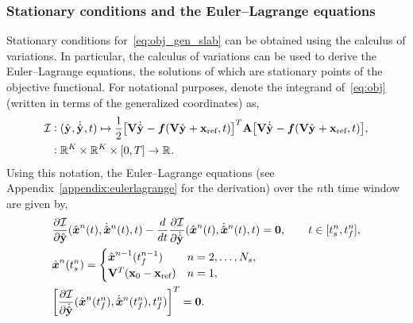 \subsubsection{Stationary conditions and the Euler--Lagrange equations}
Stationary conditions for~\eqref{eq:obj_gen_slab} can be obtained using the
calculus of variations. In particular, the calculus of variations can be used
to derive the Euler--Lagrange equations, the solutions of which are stationary 
points of the objective functional. For notational purposes, denote the
integrand of~\eqref{eq:obj} (written in terms of the generalized
coordinates) as, 
\begin{equation}\label{eq:integrand}
\begin{split}
 \minintegrandArg{n} & \vcentcolon
(\genstateyDiscreteArgnt{}, \genstateyDiscreteDotArgnt{},t) \mapsto \frac{1}{2} \big[
\basisspace \genstateyDiscreteDotArgnt{} - \velocity(\basisspace \genstateyDiscreteArgnt{}
+ \stateIntercept,t) \big]^T \stweightingMatArgt{n}{t} \big[
\basisspace \genstateyDiscreteDotArgnt{}  - \velocity(\basisspace \genstateyDiscreteArgnt{} +
\stateIntercept,t) \big], \\ & \vcentcolon \RR{\romdim} \times \RR{\romdim} \times [0,T]
 \rightarrow \RR{} .  
\end{split}
\end{equation}
Using this notation, the Euler--Lagrange equations (see
Appendix~\ref{appendix:eulerlagrange} for the derivation) over the $n$th
time window are given by, 
\begin{equation}\label{eq:el1} 
\begin{split}
& \frac{\partial
\minintegrandArg{n}}{\partial
\genstateyDiscrete}(\genstateArg{n}{t},\genstateDotArg{n}{t},t) - \frac{d}{dt}
 \frac{\partial \minintegrandArg{n}}{\partial \genstateyDiscreteDotArgnt{}} 
(\genstateArg{n}{t},\genstateDotArg{n}{t} ,t) = \bz, \qquad t \in [\timeStartArg{n},\timeEndArg{n}],\\ 
&\genstate^n(\timeStartArg{n})  = \begin{cases} 
\genstate^{n-1}(\timeEndArg{n-1}) &
n=2,\ldots,\nslabs, \\ 
\basisspace^T(\stateFOMIC - \stateIntercept) & n=1,
\end{cases}\\ 
&\bigg[ \frac{\partial \minintegrandArg{n}}{\partial \genstateyDiscreteDotArgnt{}}(\genstateArg{n}{\timeEndArg{n}},\genstateDotArg{n}{\timeEndArg{n}},\timeEndArg{n})\bigg]^T =
\bz.\end{split} 
\end{equation}
